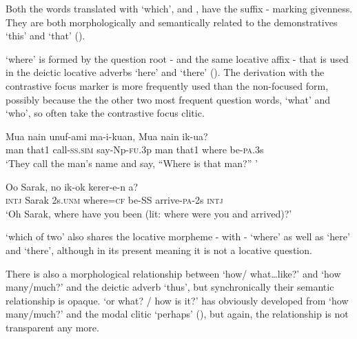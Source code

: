 Both the words translated with\textit{} `which',  and , have the suffix - marking givenness. They are both morphologically and semantically related to the demonstratives  `this' and  `that' (). 

 `where' is formed by the question root - and the same locative affix - that is used in the deictic locative adverbs  `here' and  `there' (). The derivation with the contrastive focus marker  is more frequently used than the non-focused form, possibly because the the other two most frequent question words,  `what' and  `who', so often take the contrastive focus clitic. 

\ea%
\label{ex:3:x1852}
\gll Mua nain unuf-ami ma-i-kuan, {\textquotedbl}Mua nain  ik-ua?{\textquotedbl} \\
man that1 call-\textsc{ss}.\textsc{sim} say-Np-\textsc{fu}.3p man that1 where be-\textsc{pa}.3s\\
\glt`They call the man's name and say, ``Where is that man?'' '
\z

\ea%
\label{ex:3:x1854}
\gll Oo Sarak, no  ik-ok kerer-e-n a? \\
\textsc{intj} Sarak 2s.\textsc{unm} where=\textsc{cf} be-SS arrive-\textsc{pa}-2s \textsc{intj}\\
\glt`Oh Sarak, where have you been (lit: where were you and arrived)?'
\z

 `which of two' also shares the locative morpheme - with - `where' as well as  `here' and  `there', although in its present meaning it is not a locative question.

There is also a morphological relationship between  `how/ what{\dots}like?' and  `how many/much?' and the deictic adverb  `thus', but synchronically their semantic relationship is opaque.  `or what? / how is it?' has obviously developed from  `how many/much?' and the modal clitic  `perhaps' (), but again, the relationship is not transparent any more.

